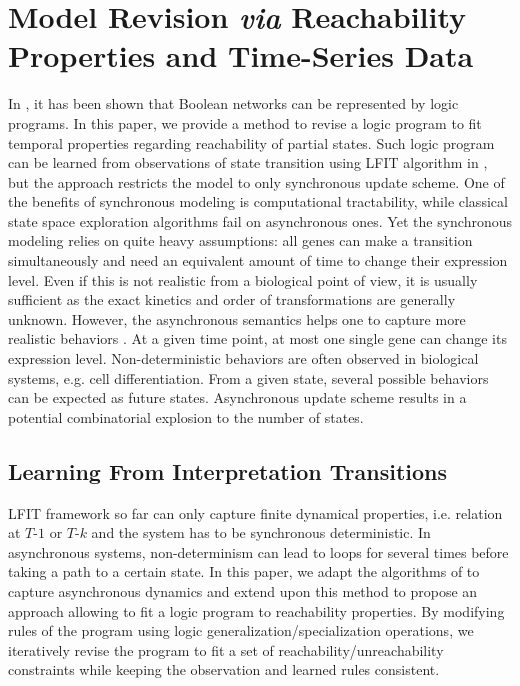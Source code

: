 \section{Model Revision \textit{via} Reachability Properties and Time-Series Data}
In \cite{inoue2011logic}, it has been shown that Boolean networks can be represented by logic programs.
In this paper, we provide a method to revise a logic program to fit temporal properties regarding reachability of partial states.
%
Such logic program can be learned from observations of state transition using LFIT algorithm in \cite{ribeiro2015learning}, but the approach restricts the model to only synchronous update scheme.
One of the benefits of synchronous modeling is computational tractability, while classical state space exploration algorithms fail on asynchronous ones.
Yet the synchronous modeling relies on quite heavy assumptions:
all genes can make a transition simultaneously and need an equivalent amount of time to change their expression level.
Even if this is not realistic from a biological point of view, it is usually sufficient as the exact kinetics and order of transformations are generally unknown.
However, the asynchronous semantics helps one to capture more realistic behaviors \cite{bernot2009}.
At a given time point, at most one single gene can change its expression level.
Non-deterministic behaviors are often observed in biological systems, e.g. cell differentiation.
From a given state, several possible behaviors can be expected as future states.
Asynchronous update scheme results in a potential combinatorial explosion to the number of states.


\subsection{Learning From Interpretation Transitions}\label{sec:lfit}
LFIT framework so far can only capture finite dynamical properties, i.e. relation at $T$-$1$ or $T$-$k$ and the system has to be synchronous deterministic.
In asynchronous systems, non-determinism can lead to loops for several times before taking a path to a certain state.
In this paper, we adapt the algorithms of \cite{ribeiro2015learning,DMTRICLP15} to capture asynchronous dynamics and extend upon this method to propose an approach allowing to fit a logic program to reachability properties.
By modifying rules of the program using logic generalization/specialization operations, we iteratively revise the program to fit a set of reachability/unreachability constraints while keeping the observation and learned rules consistent.

